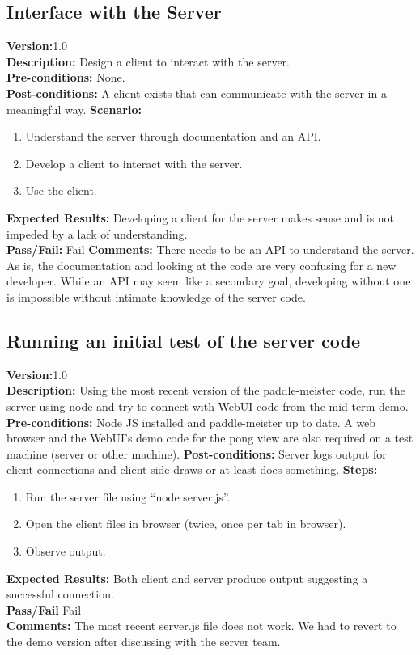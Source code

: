 \documentclass[12pt]{article}
\begin{document}
\subsection{Interface with the Server}
\textbf{Version:}1.0\\
\textbf{Description:} Design a client to interact with the server.\\
\textbf{Pre-conditions:} None.\\
\textbf{Post-conditions:} A client exists that can communicate with the server in a meaningful way.
\textbf{Scenario:}
\begin{enumerate}
 \item Understand the server through documentation and an API.
 \item Develop a client to interact with the server.
 \item Use the client.
\end{enumerate}
\textbf{Expected Results:} Developing a client for the server makes sense and is not impeded by a lack of understanding.\\
\textbf{Pass/Fail:} Fail
\textbf{Comments:} There needs to be an API to understand the server.  As is, the documentation and looking at the code are very confusing for a new developer.  While an API may seem like a secondary goal, developing without one is impossible without intimate knowledge of the server code.


\subsection{Running an initial test of the server code}
\label{sec:initialTest}
\textbf{Version:}1.0\\
\textbf{Description:} Using the most recent version of the paddle-meister code, run the server using node and try to connect with WebUI code from the mid-term demo.
\textbf{Pre-conditions:} Node JS installed and paddle-meister up to date.  A web browser and the WebUI’s demo code for the pong view are also required on a test machine (server or other machine).
\textbf{Post-conditions:} Server logs output for client connections and client side draws or at least does something.
\textbf{Steps:}
\begin{enumerate}
 \item Run the server file using “node server.js”.
 \item Open the client files in browser (twice, once per tab in browser).
 \item Observe output.
\end{enumerate}
\textbf{Expected Results:} Both client and server produce output suggesting a successful connection.\\
\textbf{Pass/Fail} Fail\\
\textbf{Comments:} The most recent server.js file does not work.  We had to revert to the demo version after discussing with the server team.
\end{document}
